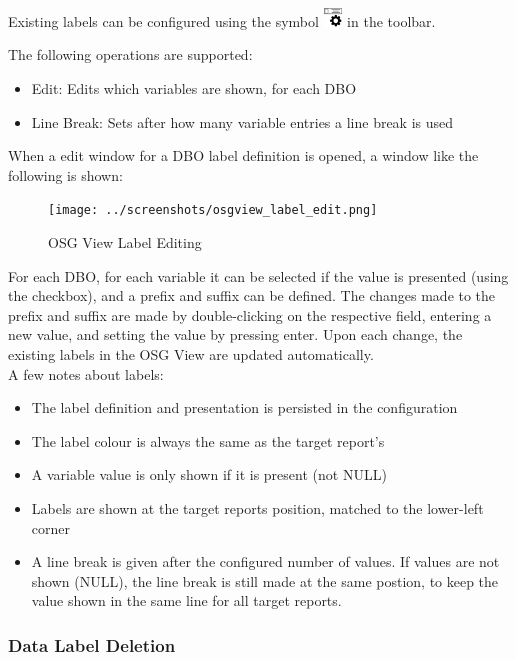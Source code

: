 {Existing labels can be configured using the symbol \includegraphics[width=0.5cm]{../../data/icons/label_edit.png} in the toolbar.

The following operations are supported:

\begin{itemize}
 \item Edit: Edits which variables are shown, for each DBO
 \item Line Break: Sets after how many variable entries a line break is used
\end{itemize}

When a edit window for a DBO label definition is opened, a window like the following is shown:

\begin{figure}[H]
    \texttt{[image: ../screenshots/osgview\_label\_edit.png]}
  \caption{OSG View Label Editing}
\end{figure}

For each DBO, for each variable it can be selected if the value is presented (using the checkbox), and a prefix and suffix can be defined. The changes made to the prefix and suffix are made by double-clicking on the respective field, entering a new value, and setting the value by pressing enter. Upon each change, the existing labels in the OSG View are updated automatically. \\

A few notes about labels:

\begin{itemize}
 \item The label definition and presentation is persisted in the configuration
 \item The label colour is always the same as the target report's
 \item A variable value is only shown if it is present (not NULL)
 \item Labels are shown at the target reports position, matched to the lower-left corner
 \item A line break is given after the configured number of values. If values are not shown (NULL), the line break is still made at the same postion, to keep the value shown in the same line for all target reports.
\end{itemize}

\subsubsection{Data Label Deletion}

}
